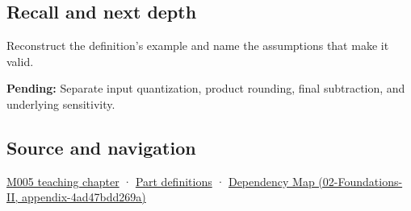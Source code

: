 \subsection{Recall and next depth}\label{appendix-a2773a6a2f9d-recall-and-next-depth}

Reconstruct the definition's example and name the assumptions that make it valid.

\textbf{Pending:} Separate input quantization, product rounding, final subtraction, and underlying sensitivity.

\subsection{Source and navigation}\label{appendix-a2773a6a2f9d-source-and-navigation}

\hyperref[01-foundations-i-ch001-when-arithmetic-meets-uncertainty]{M005 teaching chapter} · \hyperref[appendix-fd090d982a15-m005---parts-77-88]{Part definitions} · \href{../02-Foundations-II/main.pdf\#nameddest=appendix-4ad47bdd269a}{Dependency Map (02-Foundations-II, appendix-4ad47bdd269a)}
